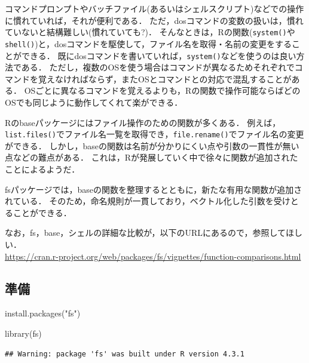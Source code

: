 \documentclass[
]{article}
\newenvironment{Shaded}{\begin{snugshade}}{\end{snugshade}}
\newcommand{\FunctionTok}[1]{\textcolor[rgb]{0.00,0.00,0.00}{#1}}
\newcommand{\NormalTok}[1]{#1}
\newcommand{\StringTok}[1]{\textcolor[rgb]{0.31,0.60,0.02}{#1}}
\begin{document}
コマンドプロンプトやバッチファイル(あるいはシェルスクリプト)などでの操作に慣れていれば，それが便利である．
ただ，dosコマンドの変数の扱いは，慣れていないと結構難しい(慣れていても?)．
そんなときは，Rの関数(\texttt{system()}や\texttt{shell()})と，dosコマンドを駆使して，ファイル名を取得・名前の変更をすることができる．
既にdosコマンドを書いていれば，\texttt{system()}などを使うのは良い方法である．
ただし，複数のOSを使う場合はコマンドが異なるためそれぞれでコマンドを覚えなければならず，またOSとコマンドとの対応で混乱することがある．
OSごとに異なるコマンドを覚えるよりも，Rの関数で操作可能ならばどのOSでも同じように動作してくれて楽ができる．

Rのbaseパッケージにはファイル操作のための関数が多くある．
例えば，\texttt{list.files()}でファイル名一覧を取得でき，\texttt{file.rename()}でファイル名の変更ができる．
しかし，baseの関数は名前が分かりにくい点や引数の一貫性が無い点などの難点がある．
これは，Rが発展していく中で徐々に関数が追加されたことによるようだ．

fsパッケージでは，baseの関数を整理するとともに，新たな有用な関数が追加されている．
そのため，命名規則が一貫しており，ベクトル化した引数を受けとることができる．

なお，fs，base，シェルの詳細な比較が，以下のURLにあるので，参照してほしい．\\
\url{https://cran.r-project.org/web/packages/fs/vignettes/function-comparisons.html}

\hypertarget{ux6e96ux5099-4}{%
\subsection{準備}\label{ux6e96ux5099-4}}

\begin{Shaded}
\begin{Highlighting}[]
\FunctionTok{install.packages}\NormalTok{(}\StringTok{"fs"}\NormalTok{)}
\end{Highlighting}
\end{Shaded}

\begin{Shaded}
\begin{Highlighting}[]
\FunctionTok{library}\NormalTok{(fs)}
\end{Highlighting}
\end{Shaded}

\begin{verbatim}
## Warning: package 'fs' was built under R version 4.3.1
\end{verbatim}
\end{document}
